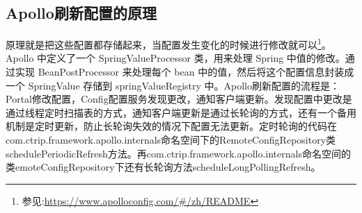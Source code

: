 \documentclass[../../../interview-questions.tex]{subfiles}
\begin{document}
\subsection{Apollo刷新配置的原理}

原理就是把这些配置都存储起来，当配置发生变化的时候进行修改就可以\footnote{参见:\url{https://www.apolloconfig.com/\#/zh/README}}。Apollo 中定义了一个 SpringValueProcessor 类，用来处理 Spring 中值的修改。通过实现 BeanPostProcessor 来处理每个 bean 中的值，然后将这个配置信息封装成一个 SpringValue 存储到 springValueRegistry 中。Apollo刷新配置的流程是：Portal修改配置，Config配置服务发现更改，通知客户端更新。发现配置中更改是通过线程定时扫描表的方式，通知客户端更新是通过长轮询的方式，还有一个备用机制是定时更新，防止长轮询失效的情况下配置无法更新。定时轮询的代码在com.ctrip.framework.apollo.internals命名空间下的RemoteConfigRepository类schedulePeriodicRefresh方法。再com.ctrip.framework.apollo.internals命名空间的类emoteConfigRepository下还有长轮询方法scheduleLongPollingRefresh。
\end{document}
